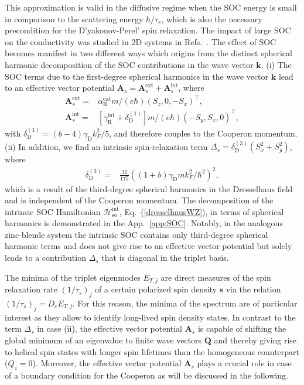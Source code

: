 \documentclass[superscriptaddress,noshowpacs,noshowkeys, twocolumn, floatfix,aps, prb,reprint]{revtex4-1}
\begin{document}
%
This approximation is valid in the diffusive regime when the SOC energy is small in comparison to the scattering energy $\hbar/\tau_e$, which is also the necessary precondition for the D'yakonov-Perel' spin relaxation. The impact of large SOC on the conductivity was studied in 2D systems in Refs.~.
The effect of SOC becomes manifest in two different ways which origins from the distinct spherical harmonic decomposition of the SOC contributions in the wave vector $\mathbf{k}$.
(i) The SOC terms due to the first-degree spherical harmonics in the wave vector $\mathbf{k}$ lead to an effective vector potential $\mathbf{A}_s=\mathbf{A}_s^\text{ext}+\mathbf{A}_s^\text{int}$, where
%
\begin{align}
\mathbf{A}_s^\text{ext}={}&\alpha_\text{R}^\text{ext} m/(e\hbar)(S_z,0,-S_x)^\top,\label{eq:EffVecPot1}\\
\mathbf{A}_s^\text{int}={}&\left[\gamma_\text{R}^\text{int}+\delta_\text{D}^{(1)}\right]m/(e\hbar)(-S_y,S_x,0)^\top,\label{eq:EffVecPot2}
\end{align}
with $\delta_\text{D}^{(1)}= (b-4)\gamma_\text{D} k_F^2/5$,  and therefore couples to the Cooperon momentum.
(ii) In addition, we find an intrinsic spin-relaxation term $\Delta_s=\delta_\text{D}^{(3)}(S_x^2+S_y^2)$, where
%
\begin{align}
\delta_\text{D}^{(3)}={}&\frac{32}{175}\left((1+b)\gamma_\text{D} m k_F^2/\hbar^2\right)^2,
\label{eq:SRterm}
\end{align}
%
which is a result of the third-degree spherical harmonics in the Dresselhaus field and is independent of the Cooperon momentum.
The decomposition of the intrinsic SOC Hamiltonian $\mathcal{H}_\text{so}^\text{int}$, Eq.~(\ref{dresselhausWZ}), in terms of spherical harmonics is demonstrated in the App.~\ref{app:SOC}.
Notably, in the analogous zinc-blende system the intrinsic SOC contains only third-degree spherical harmonic terms and does not give rise to an effective vector potential but solely leads to a contribution $\Delta_s$ that is diagonal in the triplet basis.\cite{Kammermeier2017}

The minima of the triplet eigenmodes $E_{T,j}$ are direct measures of the spin relaxation rate $(1/\tau_s)_j$ of a certain polarized spin density $\mathbf{s}$ via the relation ${(1/\tau_s)_j=D_e E_{T,j}}$.
For this reason, the minima of the spectrum are of particular interest as they allow to identify long-lived spin density states.
In contrast to the term $\Delta_s$ in case (ii), the effective vector potential $\mathbf{A}_s$ is capable of shifting the global minimum of an eigenvalue to finite wave vectors $\mathbf{Q}$ and thereby giving rise to helical spin states with longer spin lifetimes than the homogeneous counterpart ($Q_z=0$).
Moreover, the effective vector potential $\mathbf{A}_s$ plays a crucial role in case of a boundary condition for the Cooperon as will be discussed in the following.
\end{document}
